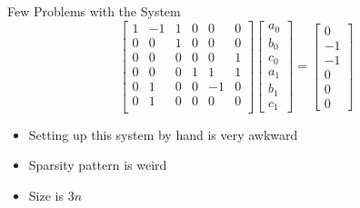\documentclass[10pt]{beamer}
\begin{document}
\begin{frame}{Few Problems with the System}
    $$
    \begin{bmatrix}
        1 & -1 & 1 & 0 & 0 &0\\
        0 & 0 & 1 & 0 & 0 & 0\\
        0 & 0 & 0 & 0 & 0 & 1\\
        0 & 0 & 0 & 1 & 1 & 1\\
        0 & 1 & 0 & 0 & -1 & 0\\
        0 & 1 & 0 & 0 & 0 & 0\\
    \end{bmatrix}\begin{bmatrix}
        a_0\\b_0\\c_0\\a_1\\b_1\\c_1
    \end{bmatrix}=\begin{bmatrix}
        0\\-1\\-1\\0\\0\\0
    \end{bmatrix}
    $$
\begin{itemize}
    \item Setting up this system by hand is very awkward
    \item Sparsity pattern is weird
    \item Size is $3n$
\end{itemize}
\vspace{2mm}



\end{frame}
\end{document}

